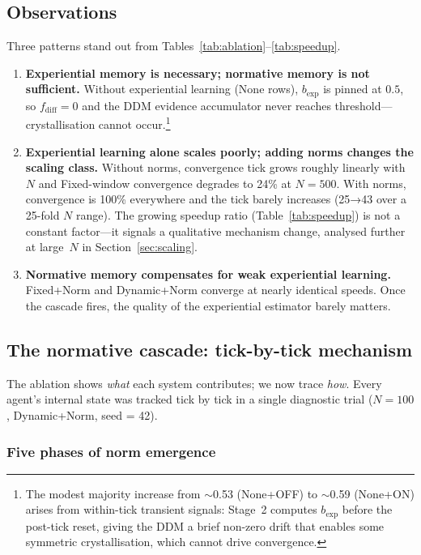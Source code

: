 \documentclass[11pt,a4paper]{article}
\begin{document}
\subsection{Observations}

Three patterns stand out from Tables~\ref{tab:ablation}--\ref{tab:speedup}.

\begin{enumerate}[nosep]
\item \textbf{Experiential memory is necessary; normative memory is not sufficient.} Without experiential learning (None rows), $b_{\exp}$ is pinned at $0.5$, so $f_{\mathrm{diff}} = 0$ and the DDM evidence accumulator never reaches threshold---crystallisation cannot occur.\footnote{The modest majority increase from $\sim$0.53 (None+OFF) to $\sim$0.59 (None+ON) arises from within-tick transient signals: Stage~2 computes $b_{\exp}$ before the post-tick reset, giving the DDM a brief non-zero drift that enables some symmetric crystallisation, which cannot drive convergence.}

\item \textbf{Experiential learning alone scales poorly; adding norms changes the scaling class.} Without norms, convergence tick grows roughly linearly with~$N$ and Fixed-window convergence degrades to 24\% at $N{=}500$. With norms, convergence is 100\% everywhere and the tick barely increases (25→43 over a 25-fold $N$ range). The growing speedup ratio (Table~\ref{tab:speedup}) is not a constant factor---it signals a qualitative mechanism change, analysed further at large~$N$ in Section~\ref{sec:scaling}.

\item \textbf{Normative memory compensates for weak experiential learning.} Fixed+Norm and Dynamic+Norm converge at nearly identical speeds. Once the cascade fires, the quality of the experiential estimator barely matters.
\end{enumerate}

\subsection{The normative cascade: tick-by-tick mechanism}
\label{sec:cascade}

The ablation shows \emph{what} each system contributes; we now trace \emph{how}. Every agent's internal state was tracked tick by tick in a single diagnostic trial ($N = 100$, Dynamic+Norm, seed = 42).

\subsubsection{Five phases of norm emergence}
\end{document}
